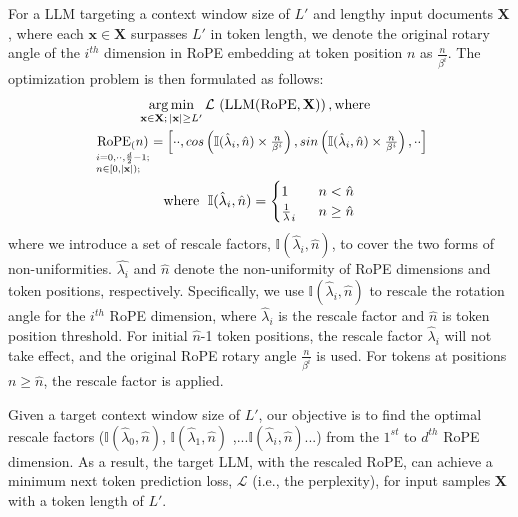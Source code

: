 \documentclass{article}
\theoremstyle{plain}
\theoremstyle{definition}
\theoremstyle{remark}
\begin{document}
For a LLM targeting a  context window size of $L'$ and lengthy input documents $\mathbf{X}$, where each $\mathbf{x}\in\mathbf{X}$ surpasses $L'$ in token length, 
we denote the original rotary angle of the $i^{th}$ dimension in RoPE embedding at token position $n$ as  $\frac{n}{\beta^i}$. The optimization problem is then formulated as follows:
\vspace{-2ex}
\begin{equation}
\begin{gathered}
		\label{eq:problem}
\underset {\mathbf{x}\in\mathbf{X}; \, |\mathbf{x}|\ge L'}{ \operatorname {arg\,min} } \,  \mathcal{L}\, \left( \text{LLM} (\text{RoPE}, \mathbf{X})\right),	\text{where \;} 
\\
\scalebox{0.93}{
$\underset {\begin{subarray}{l} i=0,\cdot\cdot,\frac{d}{2}-1;\\ n\in[ 0,|\mathbf{x}|);\end{subarray}}{\text{RoPE}_(n)}= {\left[\cdot\cdot,cos\left(\mathbb{I}(\hat{\lambda}_{i}, \hat{n})\times\frac{n}{\beta^i}\right),  sin\left(\mathbb{I}(\hat{\lambda}_{i}, \hat{n})\times\frac{n}{\beta^i}\right),\cdot\cdot\right] }$}\\
	\text{where \;} \mathbb{I}(\hat{\lambda}_{i},\hat{n})=\begin{cases}
	1&\mbox{\;  $n<\hat{n}$}\\
{\frac{1}{\lambda}_{i}}&\mbox{\; $n\geq\hat{n}$}
\end{cases}
	\end{gathered}
\end{equation}
where we introduce a set of rescale factors, $\mathbb{I}(\hat{\lambda}_{i},\hat{n})$,  to cover the two forms of non-uniformities.  $\hat{\lambda_i}$  and $\hat{n}$ denote the non-uniformity of RoPE dimensions and token positions, respectively. Specifically,
we use $\mathbb{I}(\hat{\lambda}_{i},\hat{n})$  to rescale the rotation angle for the $i^{th}$ RoPE dimension, where $\hat\lambda_{i}$ is the rescale factor and $\hat{n}$ is token position threshold. For initial $\hat{n}$-1 token positions, the rescale factor $\hat\lambda_{i}$ will not take effect, and the original RoPE rotary angle $\frac{n}{\beta^i}$ is used. For tokens at positions $n\ge\hat{n}$, the rescale factor is applied. 





 

Given a target context window size of $L'$, our objective is to find the optimal rescale factors ($\mathbb{I}(\hat{\lambda}_{0},\hat{n})$, $\mathbb{I}(\hat{\lambda}_{1},\hat{n})$ ,...$\mathbb{I}(\hat{\lambda}_{i},\hat{n})$...) from the $1^{st}$ to $d^{th}$ RoPE dimension. As a result, the target $\text{LLM}$, with the rescaled $\text{RoPE}$, can achieve a minimum next token prediction loss, $\mathcal{L}$ (i.e., the perplexity), for input samples $\mathbf{X}$ with a token length of $L'$. 
\end{document}
